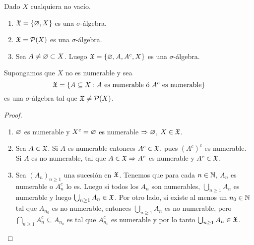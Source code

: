 \begin{eg}
    Dado $X$ cualquiera no vacío.
    \begin{enumerate}
        \item $\mathfrak{X} = \{ \varnothing, X \}$ es una $\sigma$-álgebra.
        \item $\mathfrak{X} = \mathcal{P}(X)$ es una $\sigma$-álgebra.
        \item Sea $A \neq \varnothing \subset X$. Luego $\mathfrak{X} = \{ \varnothing, A, A^c, X \}$ es una $\sigma$-álgebra.
    \end{enumerate}
\end{eg}

\begin{eg}
    Supongamos que $X$ no es numerable y sea
    \begin{equation*}
        \mathfrak{X} = \{ A \subseteq X : A \text{ es numerable ó } A^c \text{ es numerable} \}
    \end{equation*}
    es una $\sigma$-álgebra tal que $\mathfrak{X} \neq \mathcal{P}(X)$.
    \begin{proof}
        \begin{enumerate}
            \item $\varnothing$ es numerable y $X^c = \varnothing$ es numerable $\Rightarrow \varnothing$, $X \in \mathfrak{X}$.
            \item Sea $A \in \mathfrak{X}$. Si $A$ es numerable entonces $A^c \in \mathfrak{X}$, pues $(A^c)^c$ es numerable.
                 Si $A$ es no numerable, tal que $A \in \mathfrak{X} \Rightarrow A^c$ es numerable y $A^c \in \mathfrak{X}$. 
            \item Sea $(A_n)_{n \geq 1}$ una sucesión en $\mathfrak{X}$. Tenemos que para cada $n \in \mathbb{N}$, $A_n$ es numerable o $A_n^c$ lo es.
                    Luego si todos los $A_n$ son numerables, $\bigcup_{n \geq 1} A_n$ es numerable y luego $\bigcup_{n \geq 1} A_n \in \mathfrak{X}$. Por otro lado, si existe al menos un $n_0 \in \mathbb{N}$ tal que $A_{n_0}$ es no numerable, entonces 
                    $\bigcup_{n \geq 1} A_n$ es no numerable, pero $\bigcap_{n \geq 1} A_n^c \subseteq A_{n_0}$ es tal que $A_{n_0}^c$ es numerable y por lo tanto $\bigcup_{n \geq 1} A_n \in \mathfrak{X}$. 
        \end{enumerate}
    \end{proof}
\end{eg}

